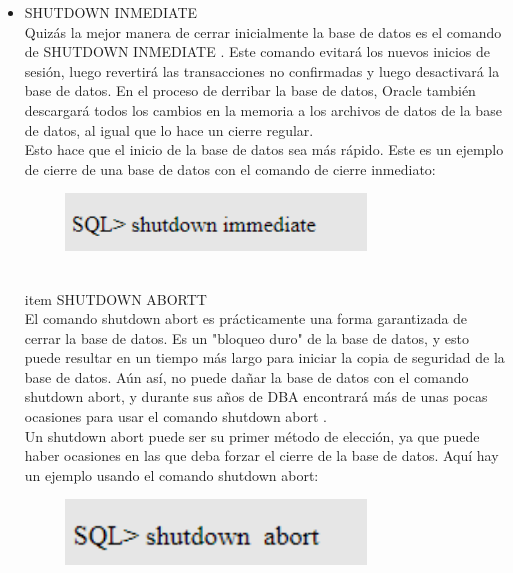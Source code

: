 \begin{itemize}
          \item SHUTDOWN INMEDIATE
	       \\Quizás la mejor manera de cerrar inicialmente la base de datos es el comando de SHUTDOWN INMEDIATE . Este comando evitará los nuevos inicios de sesión, luego revertirá las transacciones no confirmadas y luego desactivará la base de datos. En el proceso de derribar la base de datos, Oracle también descargará todos los cambios en la memoria a los archivos de datos de la base de datos, al igual que lo hace un cierre regular.
                  \\ Esto hace que el inicio de la base de datos sea más rápido.
 Este es un ejemplo de cierre de una base de datos con el comando de cierre inmediato:
                      \begin{figure}[htb]
                      \begin{center}
                      \includegraphics[width=8cm]{./Imagenes/shutdown_inmediate}
                      \end{center}
                      \end{figure}
        \\item SHUTDOWN ABORTT
                   \\El comando shutdown abort es prácticamente una forma garantizada de cerrar la base de datos. Es un "bloqueo duro" de la base de datos, y esto puede resultar en un tiempo más largo para iniciar la copia de seguridad de la base de datos. Aún así, no puede dañar la base de datos con el comando shutdown abort, y durante sus años de DBA encontrará más de unas pocas ocasiones para usar el comando shutdown abort .
                     \\Un shutdown abort  puede ser su primer método de elección, ya que puede haber ocasiones en las que deba forzar el cierre de la base de datos. Aquí hay un ejemplo usando el comando shutdown abort:
                      \begin{figure}[htb]
                      \begin{center}
                      \includegraphics[width=8cm]{./Imagenes/shutdown_abort}
                      \end{center}
                      \end{figure}
\end{itemize} 